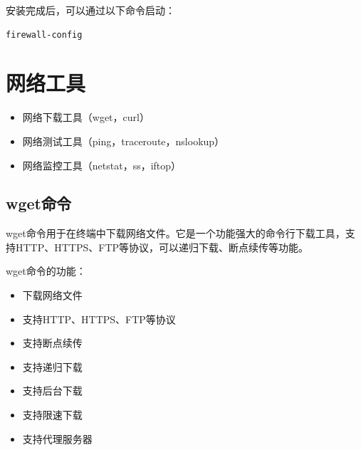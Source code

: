 \documentclass[12pt,UTF8]{ctexbook}
\begin{document}
安装完成后，可以通过以下命令启动：
\begin{verbatim}
firewall-config
\end{verbatim}

\section{网络工具}
\begin{itemize}
    \item 网络下载工具（wget，curl）
    \item 网络测试工具（ping，traceroute，nslookup）
    \item 网络监控工具（netstat，ss，iftop）
\end{itemize}

\subsection{wget命令}
wget命令用于在终端中下载网络文件。它是一个功能强大的命令行下载工具，支持HTTP、HTTPS、FTP等协议，可以递归下载、断点续传等功能。

wget命令的功能：
\begin{itemize}
    \item 下载网络文件
    \item 支持HTTP、HTTPS、FTP等协议
    \item 支持断点续传
    \item 支持递归下载
    \item 支持后台下载
    \item 支持限速下载
    \item 支持代理服务器
\end{itemize}
\end{document}
